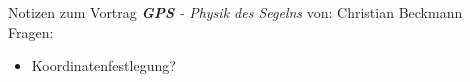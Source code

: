 
\newcommand{\ch}{$\checkmark$}

    {\huge Notizen zum Vortrag \textit{\textbf{GPS} - Physik des Segelns}}
    von: Christian Beckmann
    \tableofcontents
    Fragen:
    \begin{itemize}
        \item Koordinatenfestlegung?
    \end{itemize}
    \newpage
    
    
    
    
    
    
    
    

